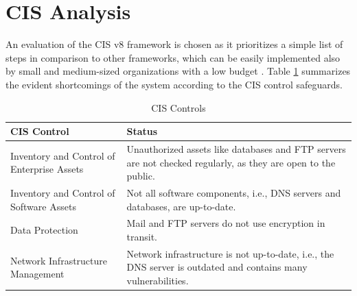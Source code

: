 \section{CIS Analysis}
An evaluation of the CIS v8 framework is chosen as it prioritizes a simple list of steps in comparison to other frameworks, which can be easily implemented also by small and medium-sized organizations with a low budget \citep[p.~59]{CIS}. Table \ref{table:cis} summarizes the evident shortcomings of the system according to the CIS control safeguards.

\newpage
\begingroup
\centering
\setlength{\tabcolsep}{6.5pt} %
\renewcommand{\arraystretch}{1.8} %
\begin{longtable}{ |p{7cm}| p{8cm} |}
\caption{CIS Controls}
    \label{table:cis}
\hline
\rowcolor{grey!15}
\textbf{CIS Control}  & \textbf{Status}\\
\hline
Inventory and Control of Enterprise Assets  &  
 Unauthorized assets like databases and FTP servers are not checked regularly, as they are open to the public.\\
\hline
Inventory and Control of Software Assets  &  
Not all software components, i.e., DNS servers and databases, are up-to-date.
\\
\hline
Data Protection  &  
Mail and FTP servers do not use encryption in transit.\\
\hline
Network Infrastructure Management  &  
 Network infrastructure is not up-to-date, i.e., the DNS server is outdated and contains many vulnerabilities.\\
\hline
\end{longtable}
\endgroup

